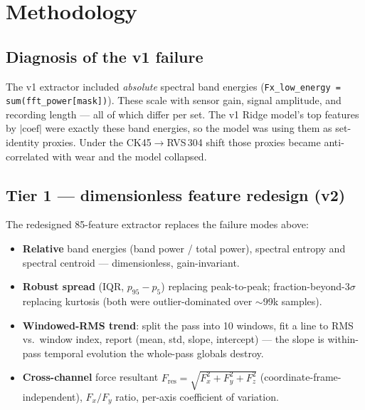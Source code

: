 \documentclass[11pt,a4paper]{article}
\newcommand{\code}[1]{\texttt{#1}}
\begin{document}
\section{Methodology}

\subsection{Diagnosis of the v1 failure}
The v1 extractor included \emph{absolute} spectral band energies
(\code{Fx\_low\_energy = sum(fft\_power[mask])}). These scale with sensor gain,
signal amplitude, and recording length --- all of which differ per set. The v1
Ridge model's top features by $|\text{coef}|$ were exactly these band energies,
so the model was using them as set-identity proxies. Under the CK45$\to$RVS\,304
shift those proxies became anti-correlated with wear and the model collapsed.

\subsection{Tier 1 --- dimensionless feature redesign (v2)}
\label{sec:tier1}
The redesigned 85-feature extractor replaces the failure modes above:
\begin{itemize}
\item \textbf{Relative} band energies (band power / total power), spectral
    entropy and spectral centroid --- dimensionless, gain-invariant.
\item \textbf{Robust spread} (IQR, $p_{95}-p_{5}$) replacing peak-to-peak;
    fraction-beyond-$3\sigma$ replacing kurtosis (both were outlier-dominated
    over $\sim$99k samples).
\item \textbf{Windowed-RMS trend}: split the pass into 10 windows, fit a line to
    RMS vs.\ window index, report (mean, std, slope, intercept) --- the slope is
    within-pass temporal evolution the whole-pass globals destroy.
\item \textbf{Cross-channel} force resultant $F_\text{res} =
    \sqrt{F_x^2+F_y^2+F_z^2}$ (coordinate-frame-independent), $F_x/F_y$ ratio,
    per-axis coefficient of variation.
\end{itemize}
\end{document}
